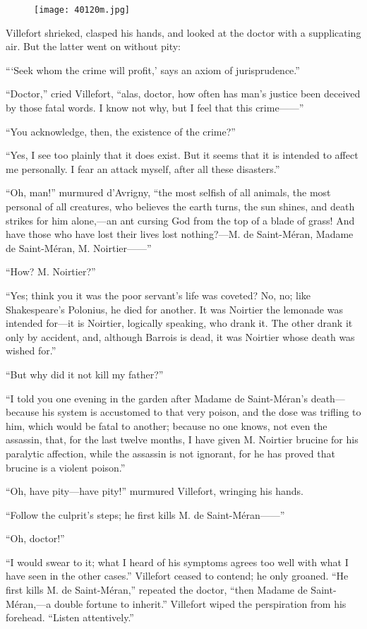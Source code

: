 \begin{figure}[ht]
\texttt{[image: 40120m.jpg]}
\end{figure}

Villefort shrieked, clasped his hands, and looked at the doctor with a
supplicating air. But the latter went on without pity:

“‘Seek whom the crime will profit,’ says an axiom of jurisprudence.”

“Doctor,” cried Villefort, “alas, doctor, how often has man’s justice
been deceived by those fatal words. I know not why, but I feel that
this crime——”

“You acknowledge, then, the existence of the crime?”

“Yes, I see too plainly that it does exist. But it seems that it is
intended to affect me personally. I fear an attack myself, after all
these disasters.”

“Oh, man!” murmured d’Avrigny, “the most selfish of all animals, the
most personal of all creatures, who believes the earth turns, the sun
shines, and death strikes for him alone,—an ant cursing God from the
top of a blade of grass! And have those who have lost their lives lost
nothing?—M. de Saint-Méran, Madame de Saint-Méran, M. Noirtier——”

“How? M. Noirtier?”

“Yes; think you it was the poor servant’s life was coveted? No, no;
like Shakespeare’s Polonius, he died for another. It was Noirtier the
lemonade was intended for—it is Noirtier, logically speaking, who drank
it. The other drank it only by accident, and, although Barrois is dead,
it was Noirtier whose death was wished for.”

“But why did it not kill my father?”

“I told you one evening in the garden after Madame de Saint-Méran’s
death—because his system is accustomed to that very poison, and the
dose was trifling to him, which would be fatal to another; because no
one knows, not even the assassin, that, for the last twelve months, I
have given M. Noirtier brucine for his paralytic affection, while the
assassin is not ignorant, for he has proved that brucine is a violent
poison.”

“Oh, have pity—have pity!” murmured Villefort, wringing his hands.

“Follow the culprit’s steps; he first kills M. de Saint-Méran——”

“Oh, doctor!”

“I would swear to it; what I heard of his symptoms agrees too well with
what I have seen in the other cases.” Villefort ceased to contend; he
only groaned. “He first kills M. de Saint-Méran,” repeated the doctor,
“then Madame de Saint-Méran,—a double fortune to inherit.” Villefort
wiped the perspiration from his forehead. “Listen attentively.”

